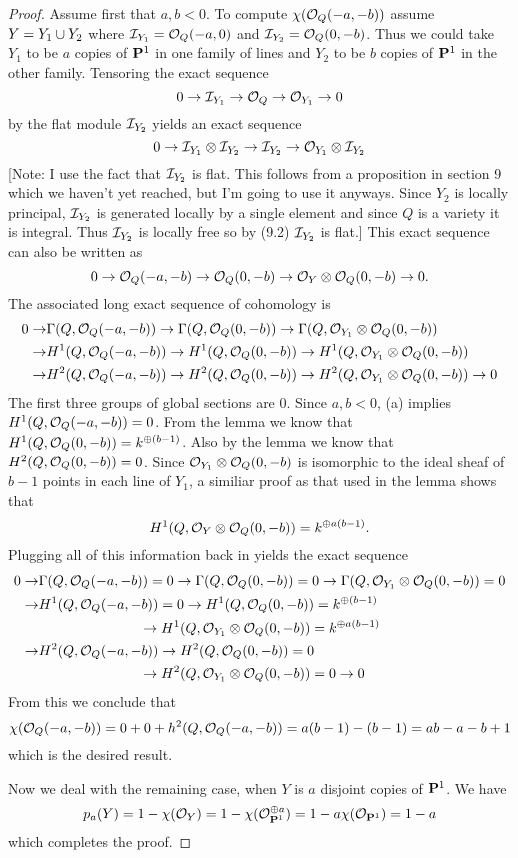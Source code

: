 \documentclass[12pt]{article}
\begin{document}
\begin{exercise}
\begin{proof}
Assume first that $a,b<0$. To compute $\chi(\soq(-a,-b))$
assume $Y=Y_1\union Y_2$ where
$\sI_{Y_1}=\soq(-a,0)$ and $\sI_{Y_2}=\soq(0,-b)$. Thus
we could take $Y_1$ to be $a$ copies of $\P^1$ in one family of lines 
and $Y_2$ to be $b$ copies of $\P^1$ in the other family. 
Tensoring the exact sequence
$$0\into\sI_{Y_1}\into\soq\into\so_{Y_1}\into 0$$
by the flat module $\sI_{Y_2}$ yields an exact sequence
$$0\into\sI_{Y_1}\tensor\sI_{Y_2}\into\sI_{Y_2}\into\sO_{Y_1}\tensor\sI_{Y_2}$$
[Note: I use the fact that $\sI_{Y_2}$ is flat. This follows
from a proposition in section 9 which we haven't yet reached, 
but I'm going to use it anyways. Since $Y_2$ is locally principal,
$\sI_{Y_2}$ is generated locally by a single element and since $Q$ is
a variety it is integral. Thus $\sI_{Y_2}$ is locally free so
by (9.2) $\sI_{Y_2}$ is flat.] 
This exact sequence can also be written as
$$0\into\soq(-a,-b)\into\soq(0,-b)\into\sO_Y\tensor\soq(0,-b)\into{}0.$$
The associated long exact sequence of cohomology is
\begin{align*}
0\into&\Gamma(Q,\soq(-a,-b))\into\Gamma(Q,\soq(0,-b))\into
                \Gamma(Q,\sO_{Y_1}\tensor\soq(0,-b))\\
\into&H^1(Q,\soq(-a,-b))\into H^1(Q,\soq(0,-b))\into H^1(Q,\sO_{Y_1}\tensor\soq(0,-b))\\
\into&H^2(Q,\soq(-a,-b))\into H^2(Q,\soq(0,-b))\into H^2(Q,\sO_{Y_1}\tensor\soq(0,-b))\into 0
\end{align*}
The first three groups of global sections are $0$. Since $a,b<0$, 
(a) implies $H^1(Q,\soq(-a,-b))=0$. From the lemma we know
that $H^1(Q,\soq(0,-b))=k^{\oplus(b-1)}$. Also by the lemma
we know that $H^2(Q,\soq(0,-b))=0$. Since
$\so_{Y_1}\tensor\soq(0,-b)$ is isomorphic
to the ideal sheaf of $b-1$ points in each line
of $Y_1$, a similiar proof as that used in the
lemma shows that $$H^1(Q,\sO_Y\tensor\soq(0,-b))=k^{\oplus{}a(b-1)}.$$
Plugging all of this information back in yields the exact sequence
\begin{align*}
0\into&\Gamma(Q,\soq(-a,-b))=0\into\Gamma(Q,\soq(0,-b))=0\into
                \Gamma(Q,\sO_{Y_1}\tensor\soq(0,-b))=0\\
\into&H^1(Q,\soq(-a,-b))=0\into H^1(Q,\soq(0,-b))=k^{\oplus(b-1)}\\
          &\hspace{1in}\into{}H^1(Q,\sO_{Y_1}\tensor\soq(0,-b))=k^{\oplus{}a(b-1)}\\
\into&H^2(Q,\soq(-a,-b))\into H^2(Q,\soq(0,-b))=0\\ 
          &\hspace{1in}\into{}H^2(Q,\sO_{Y_1}\tensor\soq(0,-b))=0\into 0
\end{align*}
From this we conclude that 
$$\chi(\soq(-a,-b))=0+0+h^2(Q,\soq(-a,-b))=a(b-1)-(b-1)=ab-a-b+1$$
which is the desired result. 
    
Now we deal with the remaining case, when $Y$ is $a$ disjoint copies
of $\P^1$. We have 
$$p_a(Y)=1-\chi(\sO_Y)=1-\chi(\sO_{\P^1}^{\oplus a})
                      =1-a\chi(\sO_{\P^1})=1-a$$ 
which completes the proof.
\end{proof}
\end{exercise}
\end{document}
